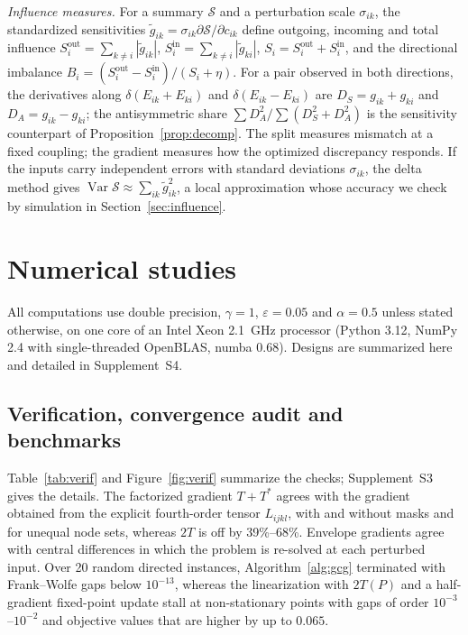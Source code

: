 \documentclass[12pt]{article}
\theoremstyle{definition}
\begin{document}
\emph{Influence measures.} For a summary $\mathcal S$ and a perturbation scale $\sigma_{ik}$, the standardized sensitivities $\tilde g_{ik}=\sigma_{ik}\partial\mathcal S/\partial c_{ik}$ define outgoing, incoming and total influence $S_i^{\mathrm{out}}=\sum_{k\neq i}|\tilde g_{ik}|$, $S_i^{\mathrm{in}}=\sum_{k\neq i}|\tilde g_{ki}|$, $S_i=S_i^{\mathrm{out}}+S_i^{\mathrm{in}}$, and the directional imbalance $B_i=(S_i^{\mathrm{out}}-S_i^{\mathrm{in}})/(S_i+\eta)$. For a pair observed in both directions, the derivatives along $\delta(E_{ik}+E_{ki})$ and $\delta(E_{ik}-E_{ki})$ are $D_S=g_{ik}+g_{ki}$ and $D_A=g_{ik}-g_{ki}$; the antisymmetric share $\sum D_A^2/\sum(D_S^2+D_A^2)$ is the sensitivity counterpart of Proposition~\ref{prop:decomp}. The split measures mismatch at a fixed coupling; the gradient measures how the optimized discrepancy responds. If the inputs carry independent errors with standard deviations $\sigma_{ik}$, the delta method gives $\operatorname{Var}\mathcal S\approx\sum_{ik}\tilde g_{ik}^2$, a local approximation whose accuracy we check by simulation in Section~\ref{sec:influence}.

\section{Numerical studies}
\label{sec:sim}

All computations use double precision, $\gamma=1$, $\varepsilon=0.05$ and $\alpha=0.5$ unless stated otherwise, on one core of an Intel Xeon 2.1~GHz processor (Python 3.12, NumPy 2.4 with single-threaded OpenBLAS, numba 0.68). Designs are summarized here and detailed in Supplement~S4.

\subsection{Verification, convergence audit and benchmarks}\label{sec:verif}

Table~\ref{tab:verif} and Figure~\ref{fig:verif} summarize the checks; Supplement~S3 gives the details. The factorized gradient $T+T^\ast$ agrees with the gradient obtained from the explicit fourth-order tensor $L_{ijkl}$, with and without masks and for unequal node sets, whereas $2T$ is off by 39\%--68\%. Envelope gradients agree with central differences in which the problem is re-solved at each perturbed input. Over 20 random directed instances, Algorithm~\ref{alg:gcg} terminated with Frank--Wolfe gaps below $10^{-13}$, whereas the linearization with $2T(P)$ and a half-gradient fixed-point update stall at non-stationary points with gaps of order $10^{-3}$--$10^{-2}$ and objective values that are higher by up to $0.065$.
\end{document}
